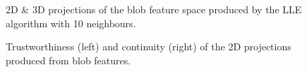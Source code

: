 \begin{figure}[H]
	\centering
	\caption{2D \& 3D projections of the blob feature space produced by the LLE algorithm with 10 neighbours.}\label{fig:blob_LLE_mapping}
\end{figure}
\clearpage

\clearpage
\begin{figure}[H]
	\centering
	\caption{Trustworthiness (left) and continuity (right) of the 2D projections produced from blob features.}\label{fig:TC_2d_blobs}
\end{figure}

